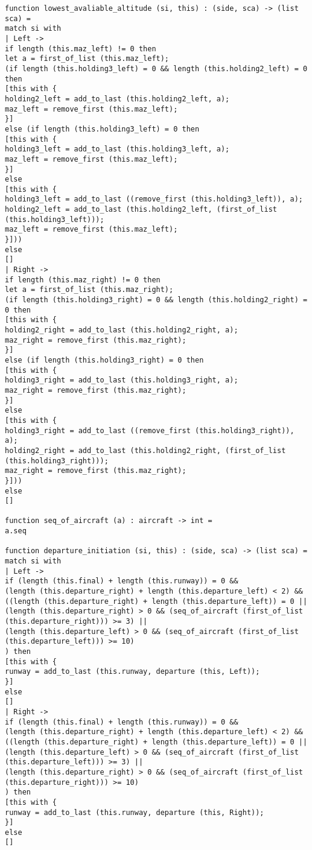 \begin{verbatim}
function lowest_avaliable_altitude (si, this) : (side, sca) -> (list sca) =
match si with
| Left ->
if length (this.maz_left) != 0 then
let a = first_of_list (this.maz_left);
(if length (this.holding3_left) = 0 && length (this.holding2_left) = 0 then
[this with {
holding2_left = add_to_last (this.holding2_left, a);
maz_left = remove_first (this.maz_left);
}]
else (if length (this.holding3_left) = 0 then
[this with {
holding3_left = add_to_last (this.holding3_left, a);
maz_left = remove_first (this.maz_left);
}]
else
[this with {
holding3_left = add_to_last ((remove_first (this.holding3_left)), a);
holding2_left = add_to_last (this.holding2_left, (first_of_list (this.holding3_left)));
maz_left = remove_first (this.maz_left);
}]))
else
[]
| Right ->
if length (this.maz_right) != 0 then
let a = first_of_list (this.maz_right);
(if length (this.holding3_right) = 0 && length (this.holding2_right) = 0 then
[this with {
holding2_right = add_to_last (this.holding2_right, a);
maz_right = remove_first (this.maz_right);
}]
else (if length (this.holding3_right) = 0 then
[this with {
holding3_right = add_to_last (this.holding3_right, a);
maz_right = remove_first (this.maz_right);
}]
else
[this with {
holding3_right = add_to_last ((remove_first (this.holding3_right)), a);
holding2_right = add_to_last (this.holding2_right, (first_of_list (this.holding3_right)));
maz_right = remove_first (this.maz_right);
}]))
else
[]

function seq_of_aircraft (a) : aircraft -> int = 
a.seq			

function departure_initiation (si, this) : (side, sca) -> (list sca) = 
match si with
| Left ->
if (length (this.final) + length (this.runway)) = 0 &&
(length (this.departure_right) + length (this.departure_left) < 2) &&
((length (this.departure_right) + length (this.departure_left)) = 0 ||
(length (this.departure_right) > 0 && (seq_of_aircraft (first_of_list (this.departure_right))) >= 3) ||
(length (this.departure_left) > 0 && (seq_of_aircraft (first_of_list (this.departure_left))) >= 10)
) then
[this with {
runway = add_to_last (this.runway, departure (this, Left));
}]
else 
[]
| Right ->
if (length (this.final) + length (this.runway)) = 0 &&
(length (this.departure_right) + length (this.departure_left) < 2) &&
((length (this.departure_right) + length (this.departure_left)) = 0 ||
(length (this.departure_left) > 0 && (seq_of_aircraft (first_of_list (this.departure_left))) >= 3) ||
(length (this.departure_right) > 0 && (seq_of_aircraft (first_of_list (this.departure_right))) >= 10)
) then
[this with {
runway = add_to_last (this.runway, departure (this, Right));
}]
else 
[]


\end{verbatim}
